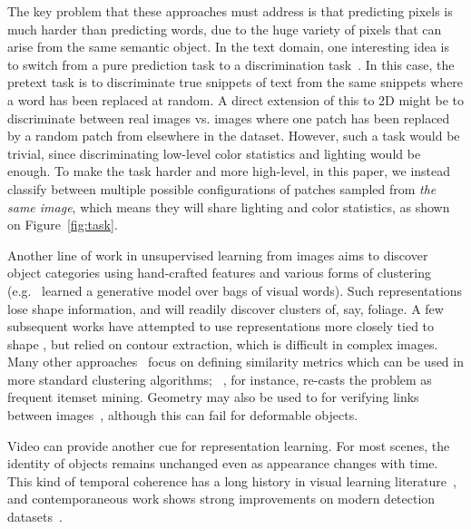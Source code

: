 \documentclass[10pt,twocolumn,letterpaper]{article}
\begin{document}
The key problem that these approaches must address is that predicting pixels is much harder than predicting words, due to the huge variety of pixels that can arise from the same semantic object. In the text domain, one 
interesting idea is to switch from a pure prediction task to a discrimination task~\cite{tsujiiythu2007discriminative,collobert2008unified}. 
In this case, the pretext task is to discriminate true snippets of text from the same snippets where a word has been replaced at random.  
A direct extension of this to 2D might be to discriminate between real images vs. images where one patch has been replaced by a random patch from elsewhere in the dataset. 
However, such a task would be trivial, since discriminating low-level color statistics and lighting would be enough.  To make the task harder and more high-level,
in this paper, we instead classify between multiple possible configurations of patches sampled from {\em the same image}, which means they will share lighting and color statistics, as shown on Figure~\ref{fig:task}.











Another line of work in unsupervised learning from images aims to discover object categories using hand-crafted features and various forms of clustering (e.g.~\cite{sivic2005discovering,russell2006using} learned a generative model over bags of visual words). %
Such representations lose shape information, and will readily discover clusters of, say, foliage.   A few subsequent works have attempted to use representations more closely tied to shape \cite{lee2009foreground,payet2010set}, but relied on contour extraction, which is difficult in complex images.  Many other approaches~\cite{grauman2006unsupervised,kim2008unsupervised,faktor2012clustering} focus on defining similarity metrics which can be used in more standard clustering algorithms; ~\cite{RematasCVPR15}, for instance, re-casts the problem as frequent itemset mining. Geometry may also be used to for verifying links between images~\cite{quack2008world,Chum09,heath2010image}, although this can fail for deformable objects.

Video can provide another cue for representation learning.  For most scenes, the identity of objects remains unchanged even as appearance changes with time.  This kind of temporal coherence has a long history in visual learning literature~\cite{foldiak1991learning,wiskott02}, and contemporaneous work shows strong improvements on modern detection datasets~\cite{wang2015unsupervised}.
\end{document}
